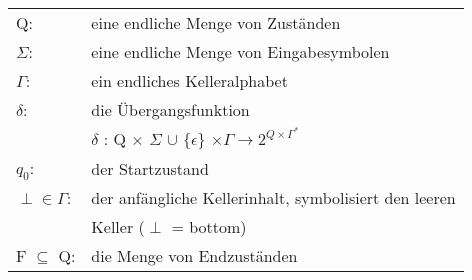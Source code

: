 \documentclass[
    border=0.2cm,
    convert={density=600}
]{standalone}
\begin{document}
\begin{tabular}{lp{11 cm}}
	Q: & eine endliche Menge von Zuständen\\
	$\Sigma$: & eine endliche Menge von Eingabesymbolen\\
	$\Gamma$: & ein endliches Kelleralphabet\\
	$\delta$: & die Übergangsfunktion\\
	&$\delta$ : Q $\times$ $\Sigma$ $\cup$ $\{\epsilon\}$ $\times \Gamma \to 2^{Q \times
		\Gamma^*{}}$ \\
	$q_0$:& der Startzustand\\
	$\perp \in \Gamma$: &  der anfängliche Kellerinhalt, symbolisiert den leeren\\
	& Keller ($\perp$ = bottom)\\
	F $\subseteq$ Q: & die Menge von Endzuständen
\end{tabular}
\end{document}
